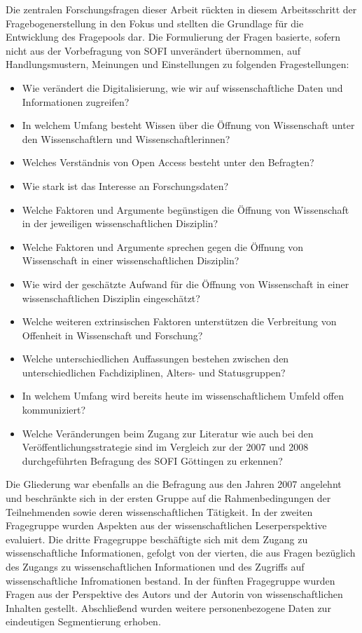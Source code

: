 Die zentralen Forschungsfragen dieser Arbeit rückten in diesem Arbeitsschritt der Fragebogenerstellung in den Fokus und stellten die Grundlage für die Entwicklung des Fragepools dar. Die Formulierung der Fragen basierte, sofern nicht aus der Vorbefragung von SOFI unverändert übernommen, auf Handlungsmustern, Meinungen und Einstellungen zu folgenden Fragestellungen:
\begin{itemize}
\item Wie verändert die Digitalisierung, wie wir auf wissenschaftliche Daten und Informationen zugreifen?
\item In welchem Umfang besteht Wissen über die Öffnung von Wissenschaft unter den Wissenschaftlern und Wissenschaftlerinnen? 
\item Welches Verständnis von Open Access besteht unter den Befragten? 
\item Wie stark ist das Interesse an Forschungsdaten? 
\item Welche Faktoren und Argumente begünstigen die Öffnung von Wissenschaft in der jeweiligen wissenschaftlichen Disziplin? 
\item Welche Faktoren und Argumente sprechen gegen die Öffnung von Wissenschaft in einer wissenschaftlichen Disziplin? 
\item Wie wird der geschätzte Aufwand für die Öffnung von Wissenschaft in einer wissenschaftlichen Disziplin eingeschätzt?
\item Welche weiteren extrinsischen Faktoren unterstützen die Verbreitung von Offenheit in Wissenschaft und Forschung? 
\item Welche unterschiedlichen Auffassungen bestehen zwischen den unterschiedlichen Fachdiziplinen, Alters- und Statusgruppen?
\item In welchem Umfang wird bereits heute im wissenschaftlichem Umfeld offen kommuniziert?
\item Welche Veränderungen beim Zugang zur Literatur wie auch bei den Veröffentlichungsstrategie sind im Vergleich zur der 2007 und 2008 durchgeführten Befragung des SOFI Göttingen zu erkennen?
\end{itemize}

Die Gliederung war ebenfalls an die Befragung aus den Jahren 2007 angelehnt und beschränkte sich in der ersten Gruppe auf die Rahmenbedingungen der Teilnehmenden sowie deren wissenschaftlichen Tätigkeit. In der zweiten Fragegruppe wurden Aspekten aus der wissenschaftlichen Leserperspektive evaluiert. Die dritte Fragegruppe beschäftigte sich mit dem Zugang zu wissenschaftliche Informationen, gefolgt von der vierten, die aus Fragen bezüglich des Zugangs zu wissenschaftlichen Informationen und des Zugriffs auf wissenschaftliche Infromationen bestand. In der fünften Fragegruppe wurden Fragen aus der Perspektive des Autors und der Autorin von wissenschaftlichen Inhalten gestellt. Abschließend wurden weitere personenbezogene Daten zur eindeutigen Segmentierung erhoben.

